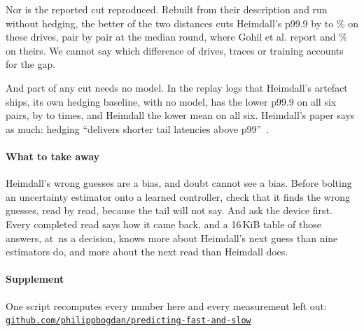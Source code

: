 \documentclass[10pt,twocolumn]{article}
\newcommand{\ns}{\,ns}
\begin{document}
Nor is the reported cut reproduced. Rebuilt from their description and run without hedging, the better of the two distances cuts Heimdall's p99.9 by \IdCutLo{} to \IdCutHi\% on these drives, pair by pair at the median round, where Gohil et al. report \StudyCutLo{} and \StudyCutHi\% on theirs. We cannot say which difference of drives, traces or training accounts for the gap.

And part of any cut needs no model. In the replay logs that Heimdall's artefact ships, its own hedging baseline, with no model, has the lower p99.9 on all six pairs, by \ArtRatioLo{} to \ArtRatioHi{} times, and Heimdall the lower mean on all six. Heimdall's paper says as much: hedging ``delivers shorter tail latencies above p99''~\cite{heimdall}.

\paragraph{What to take away}
Heimdall's wrong guesses are a bias, and doubt cannot see a bias. Before bolting an uncertainty estimator onto a learned controller, check that it finds the wrong guesses, read by read, because the tail will not say. And ask the device first. Every completed read says how it came back, and a 16\,KiB table of those answers, at \TableNs\ns{} a decision, knows more about Heimdall's next guess than nine estimators do, and more about the next read than Heimdall does.

\paragraph{Supplement}
One script recomputes every number here and every measurement left out:\\
\href{https://github.com/philippbogdan/predicting-fast-and-slow}{\nolinkurl{github.com/philippbogdan/predicting-fast-and-slow}}
\end{document}

